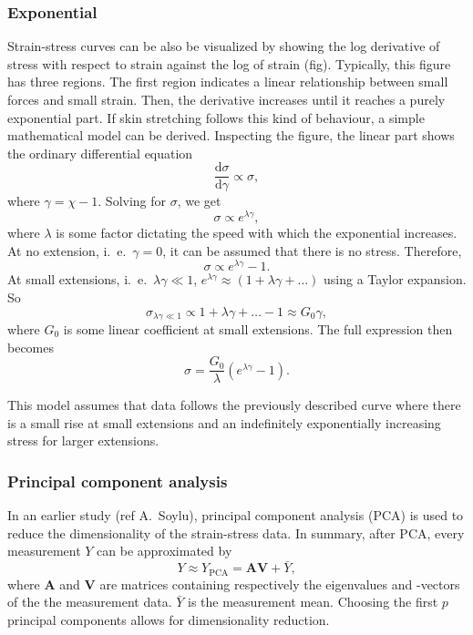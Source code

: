 \subsubsection{Exponential}
Strain-stress curves can be also be visualized by showing the log derivative of stress with respect to strain against the log of strain (fig).
Typically, this figure has three regions.
The first region indicates a linear relationship between small forces and small strain.
Then, the derivative increases until it reaches a purely exponential part.
If skin stretching follows this kind of behaviour, a simple mathematical model can be derived.
Inspecting the figure, the linear part shows the ordinary differential equation
\begin{equation}
  \frac{\mathrm{d}\sigma}{\mathrm{d}\gamma} \propto \sigma,
\end{equation}
where $\gamma = \chi - 1$.
Solving for $\sigma$, we get
\begin{equation}
  \sigma \propto e^{\lambda\gamma},
\end{equation}
where $\lambda$ is some factor dictating the speed with which the exponential increases.
At no extension, i.\ e.\ $\gamma=0$, it can be assumed that there is no stress.
Therefore,
\begin{equation}
  \sigma \propto e^{\lambda\gamma} - 1.
\end{equation}
At small extensions, i.\ e.\ $\lambda\gamma \ll 1$, $e^{\lambda\gamma} \approx (1 + \lambda\gamma + \ldots)$ using a Taylor expansion.
So
\begin{equation}
  \sigma_{\lambda\gamma\ll 1} \propto 1 + \lambda\gamma + \ldots - 1 \approx G_0 \gamma,
\end{equation}
where $G_0$ is some linear coefficient at small extensions.
The full expression then becomes
\begin{equation}
  \sigma = \frac{G_0}{\lambda}\left(e^{\lambda\gamma}-1\right).
\end{equation}

This model assumes that data follows the previously described curve where there is a small rise at small extensions and an indefinitely exponentially increasing stress for larger extensions.

\subsubsection{Principal component analysis}
In an earlier study (ref A.\ Soylu), principal component analysis (PCA) is used to reduce the dimensionality of the strain-stress data.
In summary, after PCA, every measurement $Y$ can be approximated by
\begin{equation}\label{eq:pca}
  Y \approx Y_\mathrm{PCA} = \mathbf{A} \mathbf{V} + \bar{Y},
\end{equation}
where $\mathbf{A}$ and $\mathbf{V}$ are matrices containing respectively the eigenvalues and -vectors of the the measurement data.
$\bar{Y}$ is the measurement mean.
Choosing the first $p$ principal components allows for dimensionality reduction.

